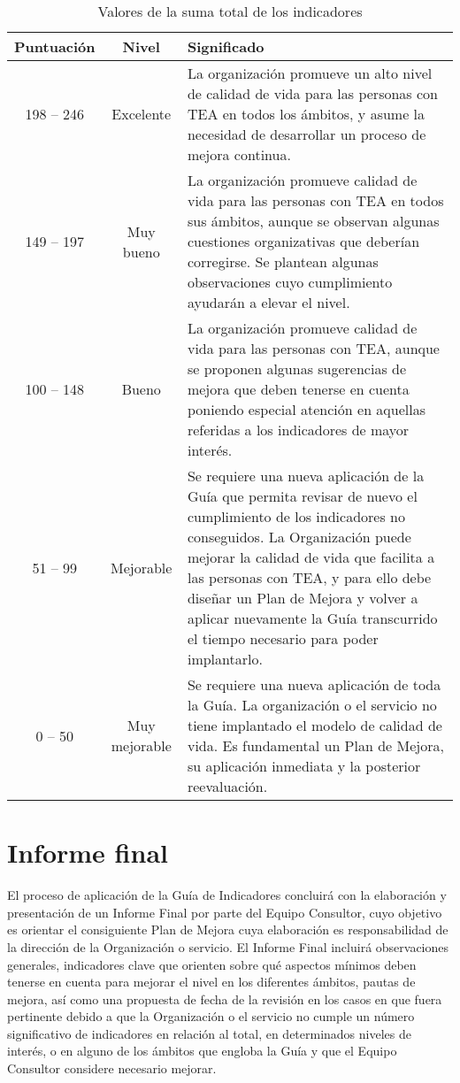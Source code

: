 \begin{table}[H]
	\centering
	\begin{tabularx}{\linewidth}{c c X}
	  \toprule
	  Puntuación & Nivel & Significado \\
	  \midrule
	  198 -- 246 & Excelente & La organización promueve un alto nivel de calidad de vida para las personas con TEA en todos los ámbitos, y asume la necesidad de desarrollar un proceso de mejora continua. \\
	  149 -- 197 & Muy bueno & La organización promueve calidad de vida para las personas con TEA en todos sus ámbitos, aunque se observan algunas cuestiones organizativas que deberían corregirse. Se plantean algunas observaciones cuyo cumplimiento ayudarán a elevar el nivel. \\
	  100 -- 148 & Bueno & La organización promueve calidad de vida para las personas con TEA, aunque se proponen algunas sugerencias de mejora que deben tenerse en cuenta poniendo especial atención en aquellas referidas a los indicadores de mayor interés. \\
	  51 -- 99 & Mejorable & Se requiere una nueva aplicación de la Guía que permita revisar de nuevo el cumplimiento de los indicadores no conseguidos. La Organización puede mejorar la calidad de vida que facilita a las personas con TEA, y para ello debe diseñar un Plan de Mejora y volver a aplicar nuevamente la Guía transcurrido el tiempo necesario para poder implantarlo. \\
	  0 -- 50 & Muy mejorable & Se requiere una nueva aplicación de toda la Guía. La organización o el servicio no tiene implantado el modelo de calidad de vida. Es fundamental un Plan de Mejora, su aplicación inmediata y la posterior reevaluación. \\
	  \bottomrule
	\end{tabularx}
	\caption{Valores de la suma total de los indicadores}
	\label{tabla:suma-total-indicadores}
  \end{table}

\section{Informe final}
El proceso de aplicación de la Guía de Indicadores concluirá con la elaboración
y presentación de un Informe Final por parte del Equipo Consultor, cuyo
objetivo es orientar el consiguiente Plan de Mejora cuya elaboración es
responsabilidad de la dirección de la Organización o servicio. El Informe Final
incluirá observaciones generales, indicadores clave que orienten sobre qué
aspectos mínimos deben tenerse en cuenta para mejorar el nivel en los diferentes
ámbitos, pautas de mejora, así como una propuesta de fecha de la revisión en los
casos en que fuera pertinente debido a que la Organización o el servicio no
cumple un número significativo de indicadores en relación al total, en
determinados niveles de interés, o en alguno de los ámbitos que engloba la Guía
y que el Equipo Consultor considere necesario mejorar.